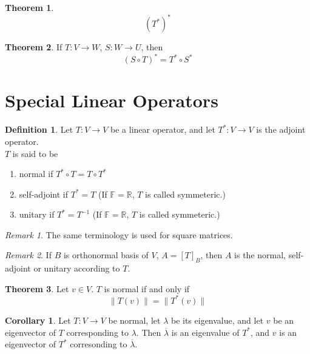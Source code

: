\documentclass[fleqn, a4paper, 12pt]{article}
\theoremstyle{definition}
\newtheorem{definition}{Definition} %
\theoremstyle{theorem}
\newtheorem{theorem}{Theorem} %
\newtheorem{corollary}{Corollary}
\theoremstyle{remark}
\newtheorem{remark}{Remark}
\numberwithin{corollary}{theorem}
\numberwithin{equation}{theorem}
\begin{document}
\begin{theorem}
	\begin{equation*}
		\left( T^* \right)^*
	\end{equation*}
\end{theorem}

\begin{theorem}
	If $T : V \to W$, $S : W \to U$, then
	\begin{equation*}
		(S \circ T)^* = T^* \circ S^*
	\end{equation*}
\end{theorem}

\section{Special Linear Operators}

\begin{definition}
	Let $T : V \to V$ be a linear operator, and let $T^* : V \to V$ is the adjoint operator.\\
	$T$ is said to be
	\begin{enumerate}
		\item normal if $T^* \circ T = T \circ T^*$
		\item self-adjoint if $T^* = T$ (If $\mathbb{F} = \mathbb{R}$, $T$ is called symmeteric.)
		\item unitary if $T^* = T^{-1}$ (If $\mathbb{F} = \mathbb{R}$, $T$ is called symmeteric.)
	\end{enumerate}
\end{definition}

\begin{remark}
	The same terminology is used for square matrices.
\end{remark}

\begin{remark}
	If $B$ is orthonormal basis of $V$, $A = [T]_B$, then $A$ is the normal, self-adjoint or unitary according to $T$.
\end{remark}

\begin{theorem}
	Let $v \in V$. $T$ is normal if and only if
	\begin{equation*}
		\| T(v) \| = \| T^*(v) \|
	\end{equation*}
\end{theorem}

\begin{corollary}
	Let $T : V \to V$ be normal, let $\lambda$ be its eigenvalue, and let $v$ be an eigenvector of $T$ corresponding to $\lambda$. Then $\overline{\lambda}$ is an eigenvalue of $T^*$, and $v$ is an eigenvector of $T^*$ corresonding to $\overline{\lambda}$.
\end{corollary}
\end{document}
